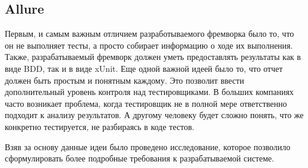 \subsection{Allure}

Первым, и самым важным отличием разработываемого фремворка было то, что он не выполняет тесты, а просто собирает информацию о ходе их выполнения. Также, разрабатываемый фремворк должен уметь предоставлять результаты как в виде BDD, так и в виде xUnit. Еще одной важной идеей было то, что отчет должен быть простым и понятным каждому. Это позволит ввести дополнительный уровень контроля над тестировщиками. В больших компаниях часто возникает проблема, когда тестировщик не в полной мере ответственно подходит к анализу результатов. А другому человеку будет сложно понять, что же конкретно тестируется, не разбираясь в коде тестов. 

Взяв за основу данные идеи было проведено исследование, которое позволило сформулировать более подробные требования к разрабатываемой системе.
